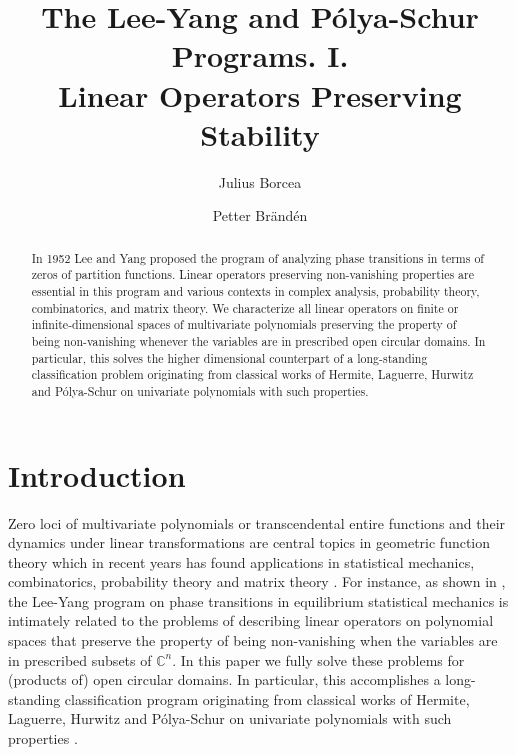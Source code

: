 \documentclass[10pt,reqno]{amsart}
\author[J.~Borcea]{Julius Borcea}
\author[P.~Br\"and\'en]{Petter Br\"and\'en}
\theoremstyle{plain}
\theoremstyle{definition}
\theoremstyle{remark}
\numberwithin{equation}{section}
\newcommand{\CC}{\mathbb{C}}
\begin{document}
\title[The Lee-Yang and P\'olya-Schur Programs. I.]{The Lee-Yang 
and P\'olya-Schur Programs. I. \\ Linear Operators Preserving Stability}

\begin{abstract} 
In 1952 Lee and Yang proposed the program of analyzing phase 
transitions in terms of zeros of 
partition functions. Linear 
operators preserving non-vanishing properties are essential in this 
program and various contexts in complex analysis, 
probability theory, combinatorics, and matrix theory. 
We characterize all linear operators on finite or infinite-dimensional
spaces of multivariate polynomials preserving 
the property of being non-vanishing whenever the variables are in 
prescribed open circular domains. In particular, this 
solves the higher dimensional counterpart of 
a long-standing classification problem originating from classical works of 
Hermite, Laguerre, Hurwitz and P\'olya-Schur on univariate polynomials with 
such properties. 
\end{abstract}

\maketitle

\tableofcontents

\section*{Introduction}\label{s-1}

Zero loci of multivariate polynomials or transcendental entire functions and 
their dynamics under linear transformations are central topics in geometric 
function theory which in recent years has found applications in 
statistical mechanics, combinatorics, probability theory and 
matrix theory \cite{BB-II,BBS2,BBCV,BBL,Br1,COSW,sok}. For instance, as shown 
in \cite{BB-II,COSW,LS}, the Lee-Yang program on phase 
transitions in equilibrium statistical mechanics \cite{LY,LY1}
is intimately related to the problems of 
describing linear operators on polynomial spaces that preserve the property 
of being non-vanishing when the variables are in prescribed 
subsets of $\CC^n$. 
In this paper we fully solve these problems 
for (products of) open circular domains. In particular, this 
accomplishes a long-standing classification program 
originating from classical works of Hermite, Laguerre, Hurwitz and 
P\'olya-Schur on univariate polynomials with such properties 
\cite{CC1,cso,lag,PS,PSz,RS}. 
\end{document}
